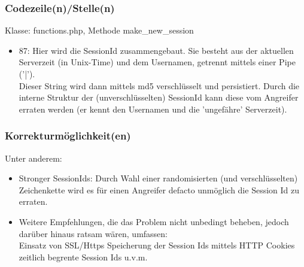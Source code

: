 \documentclass[12pt,a4paper,titlepage,oneside]{scrartcl}
\begin{document}
\subsubsection{Codezeile(n)/Stelle(n)}
\noindent
Klasse: functions.php, Methode make\_new\_session
\begin{itemize}  
\item 87: Hier wird die SessionId zusammengebaut. Sie besteht aus der aktuellen Serverzeit (in Unix-Time) und dem Usernamen, getrennt mittels einer Pipe ('|'). \\ 
Dieser String wird dann mittels md5 verschlüsselt und persistiert.
Durch die interne Struktur der (unverschlüsselten) SessionId kann diese vom Angreifer erraten werden (er kennt den Usernamen und die 'ungefähre' Serverzeit).
\end{itemize}

\subsubsection{Korrekturmöglichkeit(en)}
\noindent
Unter anderem:
\begin{itemize}
\item Stronger SessionIds: Durch Wahl einer randomisierten (und verschlüsselten) Zeichenkette wird es für einen Angreifer defacto unmöglich die Session Id zu erraten.
\item Weitere Empfehlungen, die das Problem nicht unbedingt beheben, jedoch darüber hinaus ratsam wären, umfassen: \\
\subitem Einsatz von SSL/Https
\subitem Speicherung der Session Ids mittels HTTP Cookies
\subitem zeitlich begrente Session Ids
\subitem  u.v.m.
\end{itemize}
\end{document}
